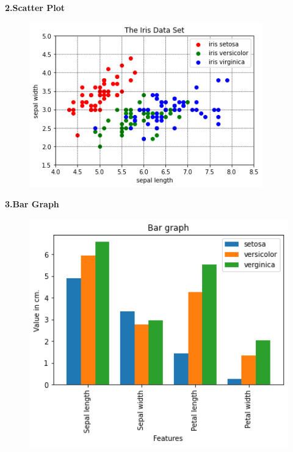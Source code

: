 \documentclass{article}
\begin{document}
\Huge\textbf{2.Scatter Plot}
\Large
\vspace{10}
\begin{figure}[h]
   \centering
    \includegraphics[width=0.9\textwidth]{2.png}
\end{figure}
\newpage

\Huge\textbf{3.Bar Graph}
\vspace{2cm}
\Large
\newpage


\begin{figure}[h]
   \centering
   \vspace{1cm}
    \includegraphics[width=1.3\textwidth]{3.png}
\end{figure}
\newpage
\end{document}
